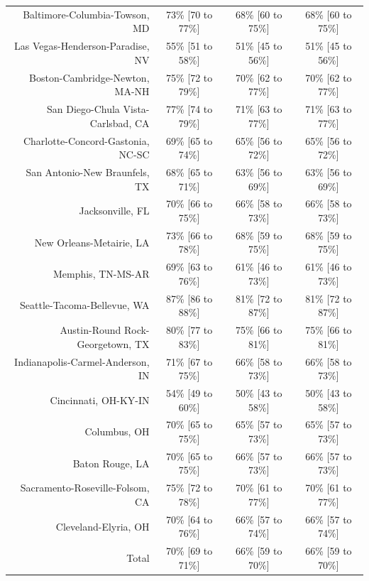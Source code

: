 \documentclass{article}
\begin{document}
\begin{table}[H]
\begin{tabular}{|r|c|c|c|}
		Baltimore-Columbia-Towson, MD & 73\% [70 to 77\%] & 68\% [60 to 75\%] & 68\% [60 to 75\%]\\
		Las Vegas-Henderson-Paradise, NV & 55\% [51 to 58\%] & 51\% [45 to 56\%] & 51\% [45 to 56\%]\\
		Boston-Cambridge-Newton, MA-NH & 75\% [72 to 79\%] & 70\% [62 to 77\%] & 70\% [62 to 77\%]\\
		San Diego-Chula Vista-Carlsbad, CA & 77\% [74 to 79\%] & 71\% [63 to 77\%] & 71\% [63 to 77\%]\\
		Charlotte-Concord-Gastonia, NC-SC & 69\% [65 to 74\%] & 65\% [56 to 72\%] & 65\% [56 to 72\%]\\
		San Antonio-New Braunfels, TX & 68\% [65 to 71\%] & 63\% [56 to 69\%] & 63\% [56 to 69\%]\\
		Jacksonville, FL & 70\% [66 to 75\%] & 66\% [58 to 73\%] & 66\% [58 to 73\%]\\
		New Orleans-Metairie, LA & 73\% [66 to 78\%] & 68\% [59 to 75\%] & 68\% [59 to 75\%]\\
		Memphis, TN-MS-AR & 69\% [63 to 76\%] & 61\% [46 to 73\%] & 61\% [46 to 73\%]\\
		Seattle-Tacoma-Bellevue, WA & 87\% [86 to 88\%] & 81\% [72 to 87\%] & 81\% [72 to 87\%]\\
		Austin-Round Rock-Georgetown, TX & 80\% [77 to 83\%] & 75\% [66 to 81\%] & 75\% [66 to 81\%]\\
		Indianapolis-Carmel-Anderson, IN & 71\% [67 to 75\%] & 66\% [58 to 73\%] & 66\% [58 to 73\%]\\
		Cincinnati, OH-KY-IN & 54\% [49 to 60\%] & 50\% [43 to 58\%] & 50\% [43 to 58\%]\\
		Columbus, OH & 70\% [65 to 75\%] & 65\% [57 to 73\%] & 65\% [57 to 73\%]\\
		Baton Rouge, LA & 70\% [65 to 75\%] & 66\% [57 to 73\%] & 66\% [57 to 73\%]\\
		Sacramento-Roseville-Folsom, CA & 75\% [72 to 78\%] & 70\% [61 to 77\%] & 70\% [61 to 77\%]\\
		Cleveland-Elyria, OH & 70\% [64 to 76\%] & 66\% [57 to 74\%] & 66\% [57 to 74\%]\\
		\hline
		Total & 70\% [69 to 71\%] & 66\% [59 to 70\%] & 66\% [59 to 70\%]\\
		\hline
	\end{tabular}
\end{table}
\end{document}
